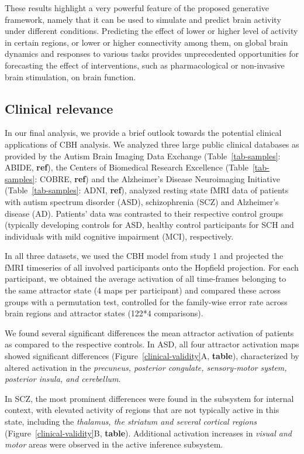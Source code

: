 \documentclass{article}
\begin{document}
These results highlight a very powerful feature of the proposed generative framework, namely that it can be used to simulate and predict brain activity under different conditions. Predicting the effect of lower or higher level of activity in certain regions, or lower or higher connectivity among them, on global brain dynamics and responses to various tasks provides unprecedented opportunities for forecasting the effect of interventions, such as pharmacological or non-invasive brain stimulation, on brain function.

\subsection{Clinical relevance}\label{Clinical relevance}

In our final analysis, we provide a brief outlook towards the potential clinical applications of CBH analysis. We analyzed three large public clinical databases as provided by the Autism Brain Imaging Data Exchange (Table~\ref{tab-samples}: ABIDE, \textbf{ref}), the Centers of Biomedical Research Excellence (Table~\ref{tab-samples}: COBRE, \textbf{ref}) and the Alzheimer's Disease Neuroimaging Initiative (Table~\ref{tab-samples}: ADNI, \textbf{ref}), analyzed resting state fMRI data of patients with autism spectrum disorder (ASD), schizophrenia (SCZ) and Alzheimer's disease (AD). Patients' data was contrasted to their respective control groups (typically developing controls for ASD, healthy control participants for SCH and individuals with mild cognitive impairment (MCI), respectively.

In all three datasets, we used the CBH model from study 1 and projected the fMRI timeseries of all involved participants onto the Hopfield projection. For each participant, we obtained the average activation of all time-frames belonging to the same attractor state (4 maps per participant) and compared these across groups with a permutation test, controlled for the family-wise error rate across brain regions and attractor states (122*4 comparisons).

We found several significant differences the mean attractor activation of patients as compared to the respective controls. In ASD, all four attractor activation maps showed significant differences (Figure~\ref{clinical-validity}A, \textbf{table}), characterized by altered activation in the \textit{precuneus, posterior congulate, sensory-motor system, posterior insula, and cerebellum}.

In SCZ, the most prominent differences were found in the subsystem for internal context, with elevated activity of regions that are not typically active in this state, including the \textit{thalamus, the striatum and several cortical regions} (Figure~\ref{clinical-validity}B, \textbf{table}). Additional activation increases in \textit{visual and motor} areas were observed in the active inference subsystem.
\end{document}
